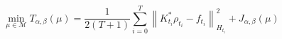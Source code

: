 \documentclass[varwidth=true, border=0pt, convert={size=640x}]{standalone}
\newcommand{\M}{\mathcal{M}}
\newcommand{\norm}[1]{\left\lVert#1\right\rVert}
\begin{document}
\begin{equation*}
    \min_{\mu \in \M} T_{\alpha,\beta}(\mu) = \frac{1}{2(T+1)} 
    \sum_{i=0}^{T}\norm{K_{t_i}^* \rho_{t_i} - f_{t_i}}_{H_{t_i}}^2 
    + J_{\alpha,\beta}(\mu)
\end{equation*}
\end{document}
